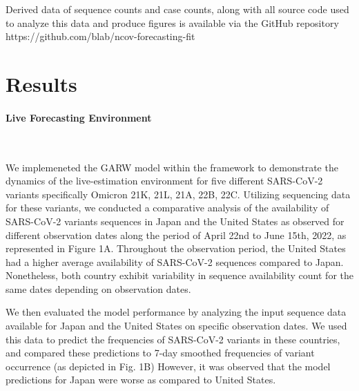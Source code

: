 \documentclass[11pt,oneside,letterpaper]{article}
\begin{document}
Derived data of sequence counts and case counts, along with all source code used to analyze
this data and produce figures is available via the GitHub repository https://github.com/blab/ncov-forecasting-fit





\section*{Results} 


\paragraph{Live Forecasting Environment}\

We implemeneted the GARW model within the framework to demonstrate the dynamics of the live-estimation environment for five different SARS-CoV-2 variants specifically Omicron 21K, 21L, 21A, 22B, 22C.
Utilizing sequencing data for these variants, we conducted a comparative analysis of the availability of SARS-CoV-2 variants sequences in Japan and the United States as observed for different observation dates along the period of April 22nd to June 15th, 2022, as represented in Figure 1A.
Throughout the observation period, the United States had a higher average availability of SARS-CoV-2 sequences compared to Japan. 
Nonetheless, both country exhibit variability in sequence availability count for the same dates depending on observation dates. 


We then evaluated the model performance by analyzing the input sequence data available for Japan and the United States on specific observation dates.
We used this data to predict the frequencies of SARS-CoV-2 variants in these countries, and compared these predictions to 7-day smoothed frequencies of variant occurrence (as depicted in Fig. 1B)
However, it was observed that the model predictions for Japan were worse as compared to United States.
\end{document}
